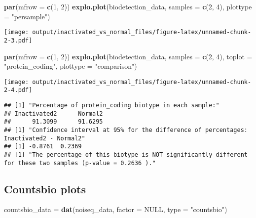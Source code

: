 \documentclass[]{article}
\newenvironment{Shaded}{\begin{snugshade}}{\end{snugshade}}
\newcommand{\KeywordTok}[1]{\textcolor[rgb]{0.13,0.29,0.53}{\textbf{#1}}}
\newcommand{\DataTypeTok}[1]{\textcolor[rgb]{0.13,0.29,0.53}{#1}}
\newcommand{\DecValTok}[1]{\textcolor[rgb]{0.00,0.00,0.81}{#1}}
\newcommand{\StringTok}[1]{\textcolor[rgb]{0.31,0.60,0.02}{#1}}
\newcommand{\OtherTok}[1]{\textcolor[rgb]{0.56,0.35,0.01}{#1}}
\newcommand{\NormalTok}[1]{#1}
\begin{document}
\begin{Shaded}
\begin{Highlighting}[]
\KeywordTok{par}\NormalTok{(}\DataTypeTok{mfrow =} \KeywordTok{c}\NormalTok{(}\DecValTok{1}\NormalTok{, }\DecValTok{2}\NormalTok{))}
\KeywordTok{explo.plot}\NormalTok{(biodetection_data, }\DataTypeTok{samples =} \KeywordTok{c}\NormalTok{(}\DecValTok{2}\NormalTok{, }\DecValTok{4}\NormalTok{), }\DataTypeTok{plottype =} \StringTok{"persample"}\NormalTok{)}
\end{Highlighting}
\end{Shaded}

\texttt{[image: output/inactivated\_vs\_normal\_files/figure-latex/unnamed-chunk-2-3.pdf]}

\begin{Shaded}
\begin{Highlighting}[]
\KeywordTok{par}\NormalTok{(}\DataTypeTok{mfrow =} \KeywordTok{c}\NormalTok{(}\DecValTok{1}\NormalTok{, }\DecValTok{2}\NormalTok{))}
\KeywordTok{explo.plot}\NormalTok{(biodetection_data, }\DataTypeTok{samples =} \KeywordTok{c}\NormalTok{(}\DecValTok{2}\NormalTok{, }\DecValTok{4}\NormalTok{), }\DataTypeTok{toplot =} \StringTok{"protein_coding"}\NormalTok{, }\DataTypeTok{plottype =} \StringTok{"comparison"}\NormalTok{)}
\end{Highlighting}
\end{Shaded}

\texttt{[image: output/inactivated\_vs\_normal\_files/figure-latex/unnamed-chunk-2-4.pdf]}

\begin{verbatim}
## [1] "Percentage of protein_coding biotype in each sample:"
## Inactivated2      Normal2 
##      91.3099      91.6295 
## [1] "Confidence interval at 95% for the difference of percentages: Inactivated2 - Normal2"
## [1] -0.8761  0.2369
## [1] "The percentage of this biotype is NOT significantly different for these two samples (p-value = 0.2636 )."
\end{verbatim}

\subsection{Countsbio plots}\label{countsbio-plots}

\begin{Shaded}
\begin{Highlighting}[]
\NormalTok{countsbio_data =}\StringTok{ }\KeywordTok{dat}\NormalTok{(noiseq_data, }\DataTypeTok{factor =} \OtherTok{NULL}\NormalTok{, }\DataTypeTok{type =} \StringTok{"countsbio"}\NormalTok{)}
\end{Highlighting}
\end{Shaded}
\end{document}
